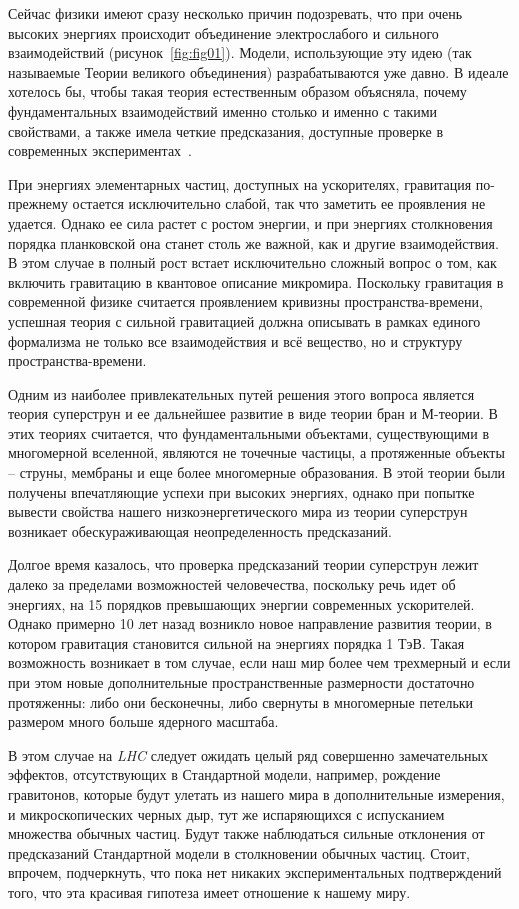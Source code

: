Сейчас физики имеют сразу несколько причин подозревать, что при очень высоких энергиях происходит объединение электрослабого и сильного взаимодействий (рисунок~\ref{fig:fig01}). Модели, использующие эту идею (так называемые Теории великого объединения) разрабатываются уже давно. В идеале хотелось бы, чтобы такая теория естественным образом объясняла, почему фундаментальных взаимодействий именно столько и именно с такими свойствами, а также имела четкие предсказания, доступные проверке в современных экспериментах~\cite{main-book2}.

При энергиях элементарных частиц, доступных на ускорителях, гравитация по-прежнему остается исключительно слабой, так что заметить ее проявления не удается. Однако ее сила растет с ростом энергии, и при энергиях столкновения порядка планковской она станет столь же важной, как и другие взаимодействия. В этом случае в полный рост встает исключительно сложный вопрос о том, как включить гравитацию в квантовое описание микромира. Поскольку гравитация в современной физике считается проявлением кривизны пространства-времени, успешная теория с сильной гравитацией должна описывать в рамках единого формализма не только все взаимодействия и всё вещество, но и структуру пространства-времени.

Одним из наиболее привлекательных путей решения этого вопроса является теория суперструн и ее дальнейшее развитие в виде теории бран и М-теории. В этих теориях считается, что фундаментальными объектами, существующими в многомерной вселенной, являются не точечные частицы, а протяженные объекты -- струны, мембраны и еще более многомерные образования. В этой теории были получены впечатляющие успехи при высоких энергиях, однако при попытке вывести свойства нашего низкоэнергетического мира из теории суперструн возникает обескураживающая неопределенность предсказаний.

Долгое время казалось, что проверка предсказаний теории суперструн лежит далеко за пределами возможностей человечества, поскольку речь идет об энергиях, на 15 порядков превышающих энергии современных ускорителей. Однако примерно 10 лет назад возникло новое направление развития теории, в котором гравитация становится сильной на энергиях порядка 1 ТэВ. Такая возможность возникает в том случае, если наш мир более чем трехмерный и если при этом новые дополнительные пространственные размерности достаточно протяженны: либо они бесконечны, либо свернуты в многомерные петельки размером много больше ядерного масштаба.

В этом случае на \textit{LHC} следует ожидать целый ряд совершенно замечательных эффектов, отсутствующих в Стандартной модели, например, рождение гравитонов, которые будут улетать из нашего мира в дополнительные измерения, и микроскопических черных дыр, тут же испаряющихся с испусканием множества обычных частиц. Будут также наблюдаться сильные отклонения от предсказаний Стандартной модели в столкновении обычных частиц. Стоит, впрочем, подчеркнуть, что пока нет никаких экспериментальных подтверждений того, что эта красивая гипотеза имеет отношение к нашему миру.

